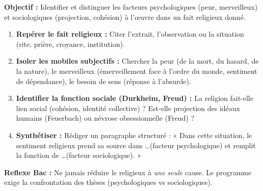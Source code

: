 \documentclass[11pt]{article}
\newcommand{\cle}[1]{{\popxbold\color{popdark}#1}}
\begin{document}
\begin{methode}
\textbf{Objectif :} Identifier et distinguer les facteurs psychologiques (peur, merveilleux) et sociologiques (projection, cohésion) à l'œuvre dans un fait religieux donné.
\begin{enumerate}
    \item \textbf{Repérer le fait religieux :} Citer l'extrait, l'observation ou la situation (rite, prière, croyance, institution).
    \item \textbf{Isoler les mobiles subjectifs :} Chercher la \cle{peur} (de la mort, du hasard, de la nature), le \cle{merveilleux} (émerveillement face à l'ordre du monde, sentiment de dépendance), le \cle{besoin de sens} (réponse à l'absurde).
    \item \textbf{Identifier la fonction sociale (Durkheim, Freud) :} La religion fait-elle \cle{lien social} (cohésion, identité collective) ? Est-elle \cle{projection} des idéaux humains (Feuerbach) ou \cle{névrose obsessionnelle} (Freud) ?
    \item \textbf{Synthétiser :} Rédiger un paragraphe structuré : « Dans cette situation, le sentiment religieux prend sa source dans \ldots (facteur psychologique) et remplit la fonction de \ldots (facteur sociologique). »
\end{enumerate}
\textbf{Reflexe Bac :} Ne jamais réduire le religieux à \emph{une seule} cause. Le programme exige la confrontation des thèses (psychologiques vs sociologiques).
\end{methode}
\end{document}
